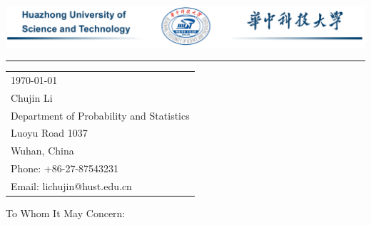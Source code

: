 \documentclass{article}
\begin{document}

\includegraphics[width=\textwidth]{head.pic-removebg.png} %

\vspace{-1em} %

\rule{\linewidth}{1pt} %

\bigskip\bigskip %


\hfill
\begin{tabular}{l @{}}
	\today \bigskip\\ %
	Chujin Li \\
	Department of Probability and Statistics\\
	Luoyu Road 1037 \\ %
	Wuhan, China \\
	Phone: +86-27-87543231 \\
	Email: lichujin@hust.edu.cn
\end{tabular}

\bigskip %



\bigskip %

To Whom It May Concern:

\bigskip %
\end{document}
